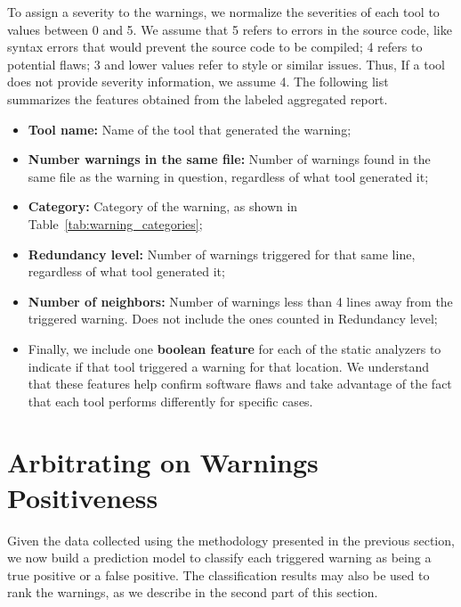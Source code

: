 To assign a severity to the warnings, we normalize the severities of each tool
to values between 0 and 5. We assume that 5 refers to errors in the source
code, like syntax errors that would prevent the source code to be compiled; 4
refers to potential flaws; 3 and lower values refer to style or similar issues.
Thus, If a tool does not provide severity information, we assume 4. The
following list summarizes the features obtained from the labeled aggregated
report.

\begin{itemize}
  \item \textbf{Tool name:} Name of the tool that generated the warning;
  \item \textbf{Number warnings in the same file:} Number of warnings found in the same file as the warning in question, regardless of what tool generated it;
  \item \textbf{Category:} Category of the warning, as shown in Table~\ref{tab:warning_categories};
  \item \textbf{Redundancy level:} Number of warnings triggered for that same line, regardless of what tool generated it;
  \item \textbf{Number of neighbors:} Number of warnings less than 4 lines away from the triggered warning. Does not include the ones counted in Redundancy level;
  \item Finally, we include one \textbf{boolean feature} for each of the static analyzers to indicate if that tool triggered a warning for that location. We understand that these features help confirm software flaws and take advantage of the fact that each tool performs differently for specific cases.
\end{itemize}


\section{Arbitrating on Warnings Positiveness}
\label{sec:positiveness}

Given the data collected using the methodology presented in the previous
section, we now build a prediction model to classify each triggered warning as
being a true positive or a false positive. The classification results may also be
used to rank the warnings, as we describe in the second part of this section.

